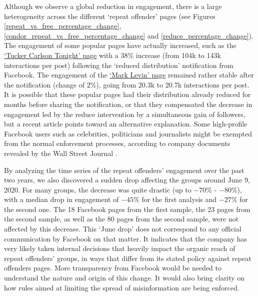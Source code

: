 \documentclass[review]{elsarticle}
\begin{document}
{Although we observe a global reduction in engagement, there is a large heterogeneity across the different `repeat offender' pages (see Figures \ref{repeat_vs_free_percentage_change}, \ref{condor_repeat_vs_free_percentage_change} and \ref{reduce_percentage_change}). 
The engagement of some popular pages have actually increased, such as the \href{https://www.facebook.com/TuckerCarlsonTonight/}{`Tucker Carlson Tonight' page} with a $38\%$ increase (from 104k to 143k interactions per post) following the `reduced distribution' notification from Facebook.
The engagement of the \href{https://www.facebook.com/marklevinshow}{`Mark Levin' page} remained rather stable after the notification (change of $2\%$), going from 20.3k to 20.7k interactions per post.
It is possible that these popular pages had their distribution already reduced for months before sharing the notification, or that they compensated the decrease in engagement led by the reduce intervention by a simultaneous gain of followers, but a recent article points toward an alternative explanation.
Some high-profile Facebook users such as celebrities, politicians and journalists might be exempted from the normal enforcement processes, according to company documents revealed by the Wall Street Journal \citep{WSJrevelations}.

By analyzing the time series of the repeat offenders’ engagement over the past two years, we also discovered a sudden drop affecting the groups around June 9, 2020.
For many groups, the decrease was quite drastic (up to $-70\%$ - $-80\%$), with a median drop in engagement of $-45\%$ for the first analysis and $-27\%$ for the second one.
The 18 Facebook pages from the first sample, the 23 pages from the second sample, as well as the 80 pages from the second sample, were not affected by this decrease.
This `June drop' does not correspond to any official communication by Facebook on that matter. 
It indicates that the company has very likely taken internal decisions that heavily impact the organic reach of repeat offenders' groups, in ways that differ from its stated policy against repeat offenders pages.
More transparency from Facebook would be needed to understand the nature and origin of this change. 
It would also bring clarity on how rules aimed at limiting the spread of misinformation are being enforced.

}
\end{document}
